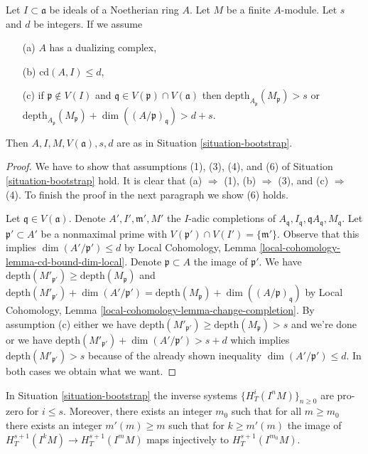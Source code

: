 \begin{lemma}
\label{lemma-bootstrap-bis-bis}
Let $I \subset \mathfrak a$ be ideals of a Noetherian ring $A$.
Let $M$ be a finite $A$-module. Let $s$ and $d$ be integers.
If we assume
\begin{enumerate}
\item[(a)] $A$ has a dualizing complex,
\item[(b)] $\text{cd}(A, I) \leq d$,
\item[(c)] if $\mathfrak p \not \in V(I)$ and
$\mathfrak q \in V(\mathfrak p) \cap V(\mathfrak a)$ then
$\text{depth}_{A_\mathfrak p}(M_\mathfrak p) > s$ or
$\text{depth}_{A_\mathfrak p}(M_\mathfrak p) +
\dim((A/\mathfrak p)_\mathfrak q) > d + s$.
\end{enumerate}
Then $A, I, M, V(\mathfrak a), s, d$ are as in
Situation \ref{situation-bootstrap}.
\end{lemma}

\begin{proof}
We have to show that assumptions (1), (3), (4), and (6) of
Situation \ref{situation-bootstrap} hold.
It is clear that (a) $\Rightarrow$ (1),
(b) $\Rightarrow$ (3), and (c) $\Rightarrow$ (4).
To finish the proof in the next paragraph we show (6) holds.

\medskip\noindent
Let $\mathfrak q \in V(\mathfrak a)$.
Denote $A', I', \mathfrak m', M'$
the $I$-adic completions of
$A_\mathfrak q, I_\mathfrak q, \mathfrak qA_\mathfrak q, M_\mathfrak q$.
Let $\mathfrak p' \subset A'$ be a nonmaximal prime with
$V(\mathfrak p') \cap V(I') = \{\mathfrak m'\}$.
Observe that this implies $\dim(A'/\mathfrak p') \leq d$
by Local Cohomology, Lemma \ref{local-cohomology-lemma-cd-bound-dim-local}.
Denote $\mathfrak p \subset A$ the image of $\mathfrak p'$.
We have
$\text{depth}(M'_{\mathfrak p'}) \geq \text{depth}(M_\mathfrak p)$ and
$\text{depth}(M'_{\mathfrak p'}) +
\dim(A'/\mathfrak p') =
\text{depth}(M_\mathfrak p) +
\dim((A/\mathfrak p)_\mathfrak q)$
by Local Cohomology, Lemma \ref{local-cohomology-lemma-change-completion}.
By assumption (c) either we have
$\text{depth}(M'_{\mathfrak p'}) \geq \text{depth}(M_\mathfrak p) > s$
and we're done or we have
$\text{depth}(M'_{\mathfrak p'}) +
\dim(A'/\mathfrak p') > s + d$ which implies
$\text{depth}(M'_{\mathfrak p'}) > s$ because of the already shown
inequality $\dim(A'/\mathfrak p') \leq d$. In both cases we
obtain what we want.
\end{proof}

\begin{lemma}
\label{lemma-bootstrap}
In Situation \ref{situation-bootstrap} the inverse systems
$\{H^i_T(I^nM)\}_{n \geq 0}$ are pro-zero for $i \leq s$.
Moreover, there exists an integer $m_0$ such that for all
$m \geq m_0$ there exists an integer $m'(m) \geq m$ such that for
$k \geq m'(m)$ the image of
$H^{s + 1}_T(I^kM) \to H^{s + 1}_T(I^mM)$
maps injectively to $H^{s + 1}_T(I^{m_0}M)$.
\end{lemma}

